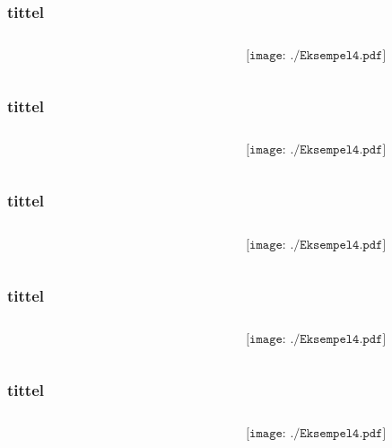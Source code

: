 \documentclass[aspectratio=169,xcolor=dvipsnames]{beamer}
\begin{document}
\begin{frame} \frametitle{tittel}
	\begin{columns}
		\begin{column}{0.5\textwidth}
			
		\end{column}
		\begin{column}{0.5\textwidth}
			$$\texttt{[image: ./Eksempel4.pdf]}$$
		\end{column}
	\end{columns}
\end{frame}

\begin{frame} \frametitle{tittel}
	\begin{columns}
		\begin{column}{0.5\textwidth}
			
		\end{column}
		\begin{column}{0.5\textwidth}
			$$\texttt{[image: ./Eksempel4.pdf]}$$
		\end{column}
	\end{columns}
\end{frame}

\begin{frame} \frametitle{tittel}
	\begin{columns}
		\begin{column}{0.5\textwidth}
			
		\end{column}
		\begin{column}{0.5\textwidth}
			$$\texttt{[image: ./Eksempel4.pdf]}$$
		\end{column}
	\end{columns}
\end{frame}

\begin{frame} \frametitle{tittel}
	\begin{columns}
		\begin{column}{0.5\textwidth}
			
		\end{column}
		\begin{column}{0.5\textwidth}
			$$\texttt{[image: ./Eksempel4.pdf]}$$
		\end{column}
	\end{columns}
\end{frame}

\begin{frame} \frametitle{tittel}
	\begin{columns}
		\begin{column}{0.5\textwidth}
			
		\end{column}
		\begin{column}{0.5\textwidth}
			$$\texttt{[image: ./Eksempel4.pdf]}$$
		\end{column}
	\end{columns}
\end{frame}
\end{document}

